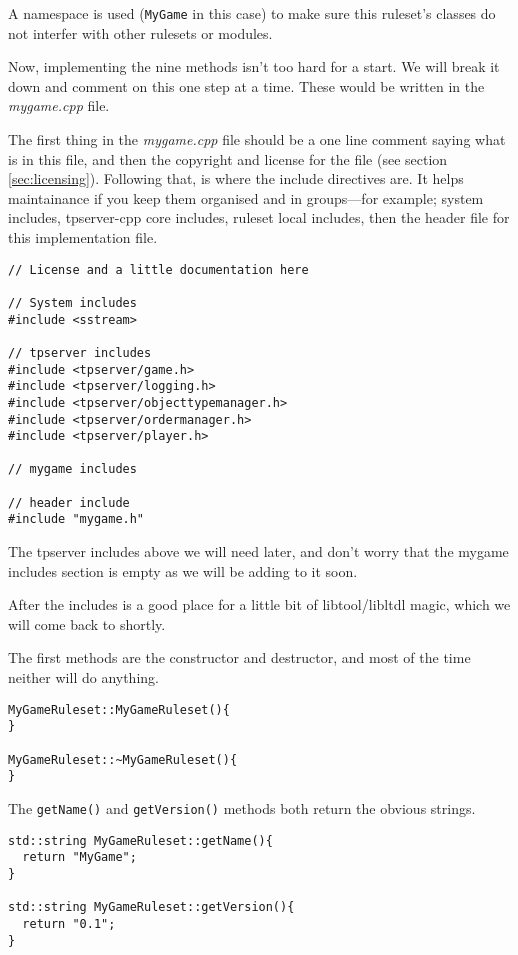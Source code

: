 \documentclass[a4paper,11pt]{report}
\newcommand{\filename}[1]{\emph{#1}}
\newcommand{\codename}[1]{\texttt{#1}}
\begin{document}
A namespace is used (\codename{MyGame} in this case) to make sure this ruleset's classes do not interfer with other rulesets or modules.

Now, implementing the nine methods isn't too hard for a start. We will break it down and comment on this one step at a time. These would be written in the \filename{mygame.cpp} file.

The first thing in the \filename{mygame.cpp} file should be a one line comment saying what is in this file, and then the copyright and license for the file (see section \ref{sec:licensing}). Following that, is where the include directives are. It helps maintainance if you keep them organised and in groups---for example; system includes, tpserver-cpp core includes, ruleset local includes, then the header file for this implementation file.

\begin{verbatim}
// License and a little documentation here

// System includes
#include <sstream>

// tpserver includes
#include <tpserver/game.h>
#include <tpserver/logging.h>
#include <tpserver/objecttypemanager.h>
#include <tpserver/ordermanager.h>
#include <tpserver/player.h>

// mygame includes

// header include
#include "mygame.h"
\end{verbatim}

The tpserver includes above we will need later, and don't worry that the mygame includes section is empty as we will be adding to it soon.

After the includes is a good place for a little bit of libtool/libltdl magic, which we will come back to shortly.

The first methods are the constructor and destructor, and most of the time neither will do anything.

\begin{verbatim}
MyGameRuleset::MyGameRuleset(){
}

MyGameRuleset::~MyGameRuleset(){
}
\end{verbatim}

The \codename{getName()} and \codename{getVersion()} methods both return the obvious strings.

\begin{verbatim}
std::string MyGameRuleset::getName(){
  return "MyGame";
}

std::string MyGameRuleset::getVersion(){
  return "0.1";
}
\end{verbatim}
\end{document}
